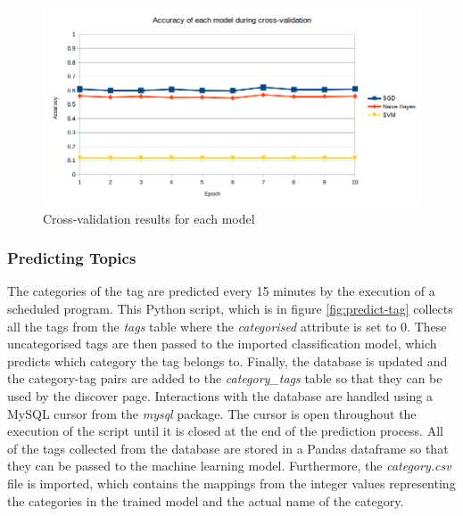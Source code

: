 \begin{figure}[H]
\centering
\includegraphics[width=\textwidth]{Images/Implementation/cv-results}
\caption{Cross-validation results for each model}
\label{fig:cv-results}
\end{figure}

\subsubsection{Predicting Topics}
The categories of the tag are predicted every 15 minutes by the execution of a scheduled program. This Python script, which is in figure \ref{fig:predict-tag} collects all the tags from the \emph{tags} table where the \emph{categorised} attribute is set to 0. These uncategorised tags are then passed to the imported classification model, which predicts which category the tag belongs to. Finally, the database is updated and the category-tag pairs are added to the \emph{category\_tags} table so that they can be used by the discover page. Interactions with the database are handled using a MySQL cursor from the \emph{mysql} package. The cursor is open throughout the execution of the script until it is closed at the end of the prediction process. All of the tags collected from the database are stored in a Pandas dataframe so that they can be passed to the machine learning model. Furthermore, the \emph{category.csv} file is imported, which contains the mappings from the integer values representing the categories in the trained model and the actual name of the category.

